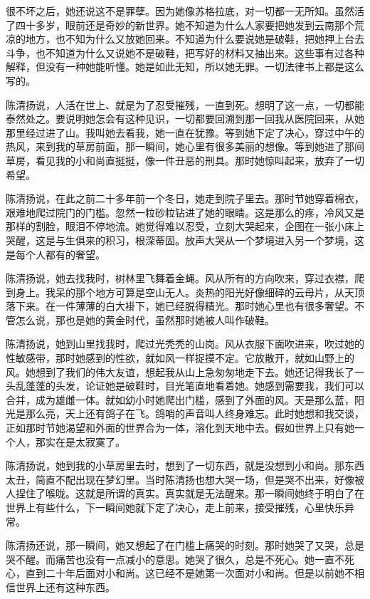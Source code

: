  很不坏之后，她还说这不是罪孽。因为她像苏格拉底，对一切都一无所知。虽然活了四十多岁，眼前还是奇妙的新世界。她不知道为什么人家要把她发到云南那个荒凉的地方，也不知为什么又放她回来。不知道为什么要说她是破鞋，把她押上台去斗争，也不知道为什么又说她不是破鞋，把写好的材料又抽出来。这些事有过各种解释，但没有一种她能听懂。她是如此无知，所以她无罪。一切法律书上都是这么写的。 
 
 陈清扬说，人活在世上、就是为了忍受摧残，一直到死。想明了这一点，一切都能泰然处之。要说明她怎会有这种见识，一切都要回溯到那一回我从医院回来，从她那里经过进了山。我叫她去看我，她一直在犹豫。等到她下定了决心，穿过中午的热风，来到我的草房前面，那一瞬间，她心里有很多美丽的想像。等到她进了那间草房，看见我的小和尚直挺挺，像一件丑恶的刑具。那时她惊叫起来，放弃了一切希望。 
 
 陈清扬说，在此之前二十多年前一个冬日，她走到院子里去。那时节她穿着棉衣，艰难地爬过院门的门槛。忽然一粒砂粒钻进了她的眼睛。这是那么的疼，冷风又是那样的割脸，眼泪不停地流。她觉得难以忍受，立刻大哭起来，企图在一张小床上哭醒，这是与生俱来的积习，根深蒂固。放声大哭从一个梦境进入另一个梦境，这是每个人都有的奢望。 
 
 陈清扬说，她去找我时，树林里飞舞着金蝇。风从所有的方向吹来，穿过衣襟，爬到身上。我呆的那个地方可算是空山无人。炎热的阳光好像细碎的云母片，从天顶落下来。在一件薄薄的白大褂下，她已经脱得精光。那时她心里也有很多奢望。不管怎么说，那也是她的黄金时代，虽然那时她被人叫作破鞋。 
 
 陈清扬说，她到山里找我时，爬过光秃秃的山岗。风从衣服下面吹进来，吹过她的性敏感带，那时她感到的性欲，就如风一样捉摸不定。它放散开，就如山野上的风。她想到了我们的伟大友谊，想起我从山上急匆匆地走下去。她还记得我长了一头乱蓬蓬的头发，论证她是破鞋时，目光笔直地看着她。她感到需要我，我们可以合并，成为雄雌一体。就如幼小时她爬出门槛，感到了外面的风。天是那么蓝，阳光是那么亮，天上还有鸽子在飞。鸽哨的声音叫人终身难忘。此时她想和我交谈，正如那时节她渴望和外面的世界合为一体，溶化到天地中去。假如世界上只有她一个人，那实在是太寂寞了。 
 
 陈清扬说，她到我的小草房里去时，想到了一切东西，就是没想到小和尚。那东西太丑，简直不配出现在梦幻里。当时陈清扬也想大哭一场，但是哭不出来，好像被人捏住了喉咙。这就是所谓的真实。真实就是无法醒来。那一瞬间她终于明白了在世界上有些什么，下一瞬间她就下定了决心，走上前来，接受摧残，心里快乐异常。 
 
 陈清扬还说，那一瞬间，她又想起了在门槛上痛哭的时刻。那时她哭了又哭，总是哭不醒。而痛苦也没有一点减小的意思。她哭了很久，总是不死心。她一直不死心，直到二十年后面对小和尚。这已经不是她第一次面对小和尚。但是以前她不相信世界上还有这种东西。 
 
